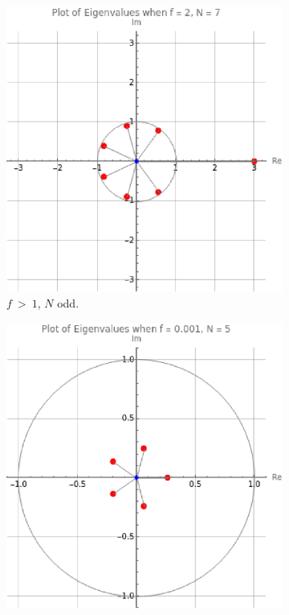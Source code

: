 \documentclass[11pt,reqno]{amsart}
\numberwithin{equation}{section}
\theoremstyle{plain}
\begin{document}
\begin{figure}[h]
    \centering
    \begin{subfigure}[b]{0.45\textwidth}
        \includegraphics[width=\textwidth]{f2N7.eps}
        \caption{$f \ > \  1$, $N$ odd.}
        \label{fig:fig1}
    \end{subfigure}
    \hfill
    \begin{subfigure}[b]{0.45\textwidth}
        \includegraphics[width=\textwidth]{fsmN5.eps}

\end{subfigure}
\end{figure}
\end{document}
